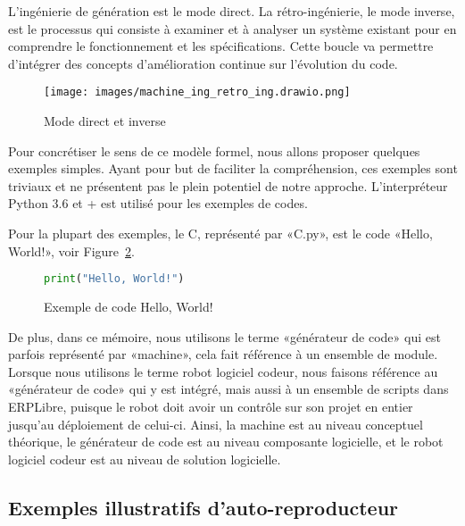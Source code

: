 L’ingénierie de génération est le mode direct. La rétro-ingénierie, le mode inverse, est le processus qui consiste à examiner et à analyser un système existant pour en comprendre le fonctionnement et les spécifications. Cette boucle va permettre d’intégrer des concepts d’amélioration continue sur l’évolution du code.

\begin{figure}[htb]
\centering
\texttt{[image: images/machine\_ing\_retro\_ing.drawio.png]}
\caption{Mode direct et inverse}
\label{fig:mode_direct_inverse}
\end{figure}

Pour concrétiser le sens de ce modèle formel, nous allons proposer quelques exemples simples. Ayant pour but de faciliter la compréhension, ces exemples sont triviaux et ne présentent pas le plein potentiel de notre approche. L’interpréteur Python 3.6 et + est utilisé pour les exemples de codes.

Pour la plupart des exemples, le C, représenté par «C.py», est le code «Hello, World!», voir Figure~\ref{fig:exemple_code_hello_world}.

\begin{figure}
\begin{lstlisting}[language=Python]
print("Hello, World!")
\end{lstlisting}
\caption{Exemple de code Hello, World!}
\label{fig:exemple_code_hello_world}
\end{figure}

De plus, dans ce mémoire, nous utilisons le terme «générateur de code» qui est parfois représenté par «machine», cela fait référence à un ensemble de module. Lorsque nous utilisons le terme robot logiciel codeur, nous faisons référence au «générateur de code» qui y est intégré, mais aussi à un ensemble de scripts dans ERPLibre, puisque le robot doit avoir un contrôle sur son projet en entier jusqu'au déploiement de celui-ci. Ainsi, la machine est au niveau conceptuel théorique, le générateur de code est au niveau composante logicielle, et le robot logiciel codeur est au niveau de solution logicielle.

\subsection{Exemples illustratifs d’auto-reproducteur}\label{exemple_illustratif_auto_reproducteur}

